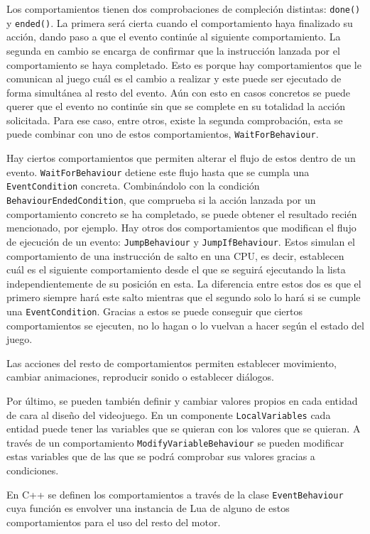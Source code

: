 \medskip

Los comportamientos tienen dos comprobaciones de compleción distintas: \texttt{done()} y \texttt{ended()}. La primera será cierta cuando el comportamiento haya finalizado su acción, dando paso a que el evento continúe al siguiente comportamiento. La segunda en cambio se encarga de confirmar que la instrucción lanzada por el comportamiento se haya completado. Esto es porque hay comportamientos que le comunican al juego cuál es el cambio a realizar y este puede ser ejecutado de forma simultánea al resto del evento. Aún con esto en casos concretos se puede querer que el evento no continúe sin que se complete en su totalidad la acción solicitada. Para ese caso, entre otros, existe la segunda comprobación, esta se puede combinar con uno de estos comportamientos, \texttt{WaitForBehaviour}. 

\medskip

Hay ciertos comportamientos que permiten alterar el flujo de estos dentro de un evento. \texttt{WaitForBehaviour} detiene este flujo hasta que se cumpla una \texttt{EventCondition} concreta. Combinándolo con la condición \texttt{BehaviourEndedCondition}, que comprueba si la acción lanzada por un comportamiento concreto se ha completado, se puede obtener el resultado recién mencionado, por ejemplo. Hay otros dos comportamientos que modifican el flujo de ejecución de un evento: \texttt{JumpBehaviour} y \texttt{JumpIfBehaviour}. Estos simulan el comportamiento de una instrucción de salto en una CPU, es decir, establecen cuál es el siguiente comportamiento desde el que se seguirá ejecutando la lista independientemente de su posición en esta. La diferencia entre estos dos es que el primero siempre hará este salto mientras que el segundo solo lo hará si se cumple una \texttt{EventCondition}. Gracias a estos se puede conseguir que ciertos comportamientos se ejecuten, no lo hagan o lo vuelvan a hacer según el estado del juego.

\smallskip

Las acciones del resto de comportamientos permiten establecer movimiento, cambiar animaciones, reproducir sonido o establecer diálogos. 

\medskip

Por último, se pueden también definir y cambiar valores propios en cada entidad de cara al diseño del videojuego. En un componente \texttt{LocalVariables} cada entidad puede tener las variables que se quieran con los valores que se quieran. A través de un comportamiento \texttt{ModifyVariableBehaviour} se pueden modificar estas variables que de las que se podrá comprobar sus valores gracias a condiciones. 

\medskip

En C++ se definen los comportamientos a través de la clase \texttt{EventBehaviour} cuya función es envolver una instancia de Lua de alguno de estos comportamientos para el uso del resto del motor. 
